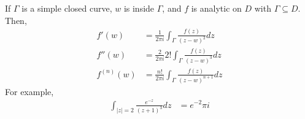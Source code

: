 \documentclass[10pt]{extarticle}
\begin{document}
  If $\Gamma$ is a simple closed curve, $w$ is inside $\Gamma$, and $f$ is analytic on $D$ with $\Gamma \subseteq D$. Then,
  \begin{align*}
    f'(w) &= \frac{1}{2\pi i}\int_{\Gamma}\frac{f(z)}{(z-w)^2}dz\\
    f''(w) &= \frac{2}{2\pi i}2! \int_{\Gamma}\frac{f(z)}{(z-w)^3}dz\\
    f^{(n)}(w) &= \frac{n!}{2\pi i}\int_{\Gamma}\frac{f(z)}{(z-w)^{n+1}}dz
  \end{align*}
  For example,
  \begin{align*}
    \int_{|z|=2}\frac{e^{-z}}{(z+1)^3}dz &= e^{-2}\pi i
  \end{align*}
\end{document}

